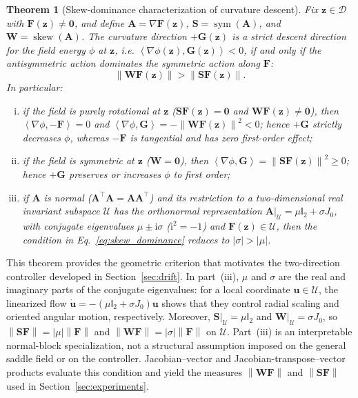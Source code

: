 \documentclass{article}
\newtheorem{theorem}{Theorem}
\theoremstyle{remark}
\newcommand{\inner}[2]{\left\langle #1,#2\right\rangle}
\newcommand{\norm}[1]{\left\lVert #1\right\rVert}
\newcommand{\Id}{\mathsf{I}}
\newcommand{\sym}{\operatorname{sym}}
\newcommand{\skewop}{\operatorname{skew}}
\newcommand{\cD}{\mathcal{D}}
\newcommand{\bz}{\boldsymbol{z}}
\newcommand{\bu}{\boldsymbol{u}}
\newcommand{\bzero}{\boldsymbol{0}}
\newcommand{\bW}{\boldsymbol{W}}
\newcommand{\bS}{\boldsymbol{S}}
\newcommand{\bA}{\boldsymbol{A}}
\newcommand{\bF}{\boldsymbol{F}}
\newcommand{\bG}{\boldsymbol{G}}
\begin{document}
\begin{theorem}[Skew-dominance characterization of curvature descent]\label{thm:skew_dominance}
Fix $\bz\in\cD$ with $\bF(\bz)\neq\bzero$, and define $\bA=\nabla\bF(\bz)$, $\bS=\sym(\bA)$, and $\bW=\skewop(\bA)$.
The curvature direction $+\bG(\bz)$ is a strict descent direction for the field energy $\phi$ at $\bz$, i.e. $\inner{\nabla\phi(\bz)}{\bG(\bz)}<0$, if and only if the antisymmetric action dominates the symmetric action along $\bF$:
\begin{equation}\label{eq:skew_dominance}
\norm{\bW\bF(\bz)}
>
\norm{\bS\bF(\bz)}.
\end{equation}
In particular:
\begin{enumerate}[(i)]
\item if the field is purely rotational at $\bz$ ($\bS\bF(\bz)=\bzero$ and $\bW\bF(\bz)\neq\bzero$), then $\inner{\nabla\phi}{-\bF}=0$ and $\inner{\nabla\phi}{\bG}=-\norm{\bW\bF(\bz)}^{2}<0$; hence $+\bG$ strictly decreases $\phi$, whereas $-\bF$ is tangential and has zero first-order effect;
\item if the field is symmetric at $\bz$ ($\bW=\bzero$), then $\inner{\nabla\phi}{\bG}=\norm{\bS\bF(\bz)}^{2}\ge0$; hence $+\bG$ preserves or increases $\phi$ to first order;
\item if $\bA$ is normal ($\bA^\top\bA=\bA\bA^\top$) and its restriction to a two-dimensional real invariant subspace $\mathcal U$ has the orthonormal representation $\bA|_{\mathcal U}=\mu\Id_2+\sigma J_0$, with conjugate eigenvalues $\mu\pm\mathrm{i}\sigma$ ($\mathrm{i}^2=-1$) and $\bF(\bz)\in\mathcal U$, then the condition in Eq.~\eqref{eq:skew_dominance} reduces to $\lvert\sigma\rvert>\lvert\mu\rvert$.
\end{enumerate}
\end{theorem}

This theorem provides the geometric criterion that motivates the two-direction controller developed in Section~\ref{sec:drift}.
In part~(iii), $\mu$ and $\sigma$ are the real and imaginary parts of the conjugate eigenvalues: for a local coordinate $\bu\in\mathcal U$, the linearized flow $\dot{\bu}=-(\mu\Id_2+\sigma J_0)\bu$ shows that they control radial scaling and oriented angular motion, respectively.
Moreover, $\bS|_{\mathcal U}=\mu\Id_2$ and $\bW|_{\mathcal U}=\sigma J_0$, so $\norm{\bS\bF}=\lvert\mu\rvert\norm{\bF}$ and $\norm{\bW\bF}=\lvert\sigma\rvert\norm{\bF}$ on $\mathcal U$.
Part~(iii) is an interpretable normal-block specialization, not a structural assumption imposed on the general saddle field or on the controller.
Jacobian--vector and Jacobian-transpose--vector products evaluate this condition and yield the measures $\norm{\bW\bF}$ and $\norm{\bS\bF}$ used in Section~\ref{sec:experiments}.
\end{document}
